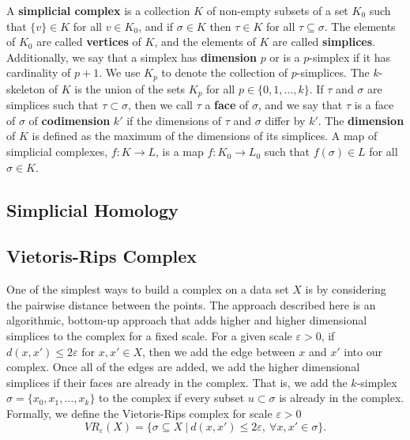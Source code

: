 \documentclass[letterpaper,titlepage]{article}
\begin{document}
    \begin{defn}
        A \textbf{simplicial complex} is a collection $K$ of non-empty subsets of a set $K_0$ such that $\{v\} \in K$ for all $v \in K_0$, and if $\sigma \in K$ then $\tau \in K$ for all $\tau \subseteq \sigma$. The elements of $K_0$ are called \textbf{vertices} of $K$, and the elements of $K$ are called \textbf{simplices}. Additionally, we say that a simplex has \textbf{dimension} $p$ or is a $p$-simplex if it has cardinality of $p+1$. We use $K_p$ to denote the collection of $p$-simplices. The $k$-skeleton of $K$ is the union of the sets $K_p$ for all $p \in \{0,1,\dots,k\}$. If $\tau$ and $\sigma$ are simplices such that $\tau \subset \sigma$, then we call $\tau$ a \textbf{face} of $\sigma$, and we say that $\tau$ is a face of $\sigma$ of \textbf{codimension} $k'$ if the dimensions of $\tau$ and $\sigma$ differ by $k'$. The \textbf{dimension} of $K$ is defined as the maximum of the dimensions of its simplices. A map of simplicial complexes, $f: K \to L$, is a map $f: K_0 \to L_0$ such that $f(\sigma) \in L$ for all $\sigma \in K$. \cite{Edelsbrunner}
    \end{defn}
    
\subsection{Simplicial Homology}


\subsection{Vietoris-Rips Complex} \label{rips}
One of the simplest ways to build a complex on a data set $X$ is by considering the pairwise distance between the points. The approach described here is an algorithmic, bottom-up approach that adds higher and higher dimensional simplices to the complex for a fixed scale. For a given scale $\varepsilon>0$, if $d(x,x')\leq 2\varepsilon$ for $x,x' \in X$, then we add the edge between $x$ and $x'$ into our complex. Once all of the edges are added, we add the higher dimensional simplices if their faces are already in the complex. That is, we add the $k$-simplex $\sigma = \{x_0,x_1,\dots,x_k\}$ to the complex if every subset $u \subset \sigma$ is already in the complex. Formally, we define the Vietoris-Rips complex \cite{Roadmap} for scale $\varepsilon>0$ 
$$VR_{\varepsilon}(X) = \{\sigma \subseteq X\ |\ d(x,x') \leq 2\varepsilon,\ \forall x,x' \in \sigma\}.$$
\end{document}
